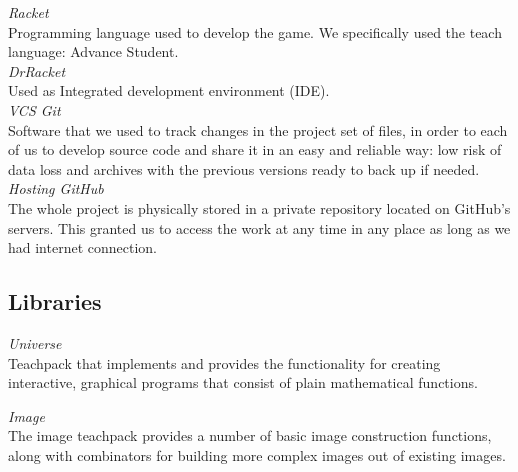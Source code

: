 \documentclass{article}
\begin{document}
\hspace{0.5cm}\textit{Racket}\\
Programming language used to develop the game.
We specifically used the teach language: Advance Student.\\
 

\textit{DrRacket}\\
Used as Integrated development environment (IDE).\\
 
\textit{VCS Git}\\
Software that we used to track changes in the project set of files, in order to each of us to develop source code and share it in an easy and reliable way: low risk of data loss and archives with the previous versions ready to back up if needed.\\

\textit{Hosting GitHub}\\
The whole project is physically stored in a private repository located on GitHub's servers. This granted us to access the work at any time in any place as long as we had internet connection.

\subsection{Libraries}
\hspace{0.5cm}\textit{Universe}\\
Teachpack that implements and provides the functionality for creating interactive, graphical programs that consist of plain mathematical functions.

\textit{Image}\\
The image teachpack provides a number of basic image construction functions, along with combinators for building more complex images out of existing images.

\end{document}
